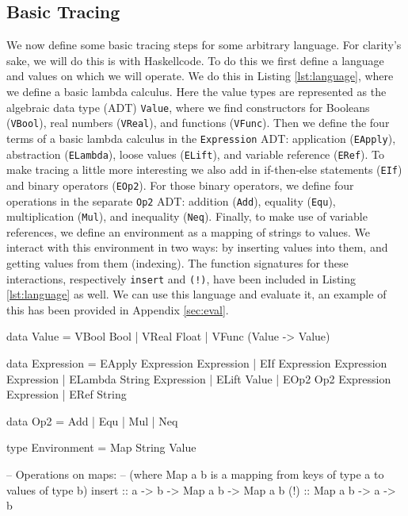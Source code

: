    \subsection{Basic Tracing} \label{sec:steps}
        We now define some basic tracing steps for some arbitrary language.
        For clarity's sake, we will do this is with Haskell\cn code.
        To do this we first define a language and values on which we will operate.
        We do this in Listing \ref{lst:language}, where we define a basic lambda calculus.
        Here the value types are represented as the algebraic data type (ADT) \texttt{Value}, where we find constructors for Booleans (\texttt{VBool}), real numbers (\texttt{VReal}), and functions (\texttt{VFunc}).
        Then we define the four terms of a basic lambda calculus in the \texttt{Expression} ADT: application (\texttt{EApply}), abstraction (\texttt{ELambda}), loose values (\texttt{ELift}), and variable reference (\texttt{ERef}).
        To make tracing a little more interesting we also add in if-then-else statements (\texttt{EIf}) and binary operators (\texttt{EOp2}).
        For those binary operators, we define four operations in the separate \texttt{Op2} ADT: addition (\texttt{Add}), equality (\texttt{Equ}), multiplication (\texttt{Mul}), and inequality (\texttt{Neq}).
        Finally, to make use of variable references, we define an environment as a mapping of strings to values.
        We interact with this environment in two ways: by inserting values into them, and getting values from them (indexing).
        The function signatures for these interactions, respectively \texttt{insert} and \texttt{(!)}, have been included in Listing \ref{lst:language} as well.
        We can use this language and evaluate it, an example of this has been provided in Appendix \ref{sec:eval}.

        \begin{haskell}[caption=Minimal lambda calculus with added if-then-else and binary operators, label=lst:language, gobble=12]
            data Value = VBool Bool | VReal Float | VFunc (Value -> Value)

            data Expression
                = EApply  Expression Expression
                | EIf     Expression Expression Expression
                | ELambda String     Expression
                | ELift   Value
                | EOp2    Op2        Expression Expression
                | ERef    String

            data Op2 = Add | Equ | Mul | Neq

            type Environment = Map String Value

            -- Operations on maps:
            -- (where Map a b is a mapping from keys of type a to values of type b)
            insert :: a -> b -> Map a b -> Map a b
            (!) :: Map a b -> a -> b
        \end{haskell}

